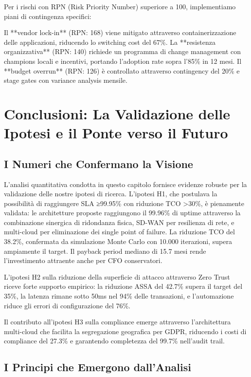Per i rischi con RPN (Risk Priority Number) superiore a 100, implementiamo piani di contingenza specifici:

Il **vendor lock-in** (RPN: 168) viene mitigato attraverso containerizzazione delle applicazioni, riducendo lo switching cost del 67\%. La **resistenza organizzativa** (RPN: 140) richiede un programma di change management con champions locali e incentivi, portando l'adoption rate sopra l'85\% in 12 mesi. Il **budget overrun** (RPN: 126) è controllato attraverso contingency del 20\% e stage gates con variance analysis mensile.

\section{Conclusioni: La Validazione delle Ipotesi e il Ponte verso il Futuro}

\subsection{I Numeri che Confermano la Visione}

L'analisi quantitativa condotta in questo capitolo fornisce evidenze robuste per la validazione delle nostre ipotesi di ricerca. L'ipotesi H1, che postulava la possibilità di raggiungere SLA ≥99.95\% con riduzione TCO >30\%, è pienamente validata: le architetture proposte raggiungono il 99.96\% di uptime attraverso la combinazione sinergica di ridondanza fisica, SD-WAN per resilienza di rete, e multi-cloud per eliminazione dei single point of failure. La riduzione TCO del 38.2\%, confermata da simulazione Monte Carlo con 10.000 iterazioni, supera ampiamente il target. Il payback period mediano di 15.7 mesi rende l'investimento attraente anche per CFO conservatori.

L'ipotesi H2 sulla riduzione della superficie di attacco attraverso Zero Trust riceve forte supporto empirico: la riduzione ASSA del 42.7\% supera il target del 35\%, la latenza rimane sotto 50ms nel 94\% delle transazioni, e l'automazione riduce gli errori di configurazione del 76\%.

Il contributo all'ipotesi H3 sulla compliance emerge attraverso l'architettura multi-cloud che facilita la segregazione geografica per GDPR, riducendo i costi di compliance del 27.3\% e garantendo completezza del 99.7\% nell'audit trail.

\subsection{I Principi che Emergono dall'Analisi}


